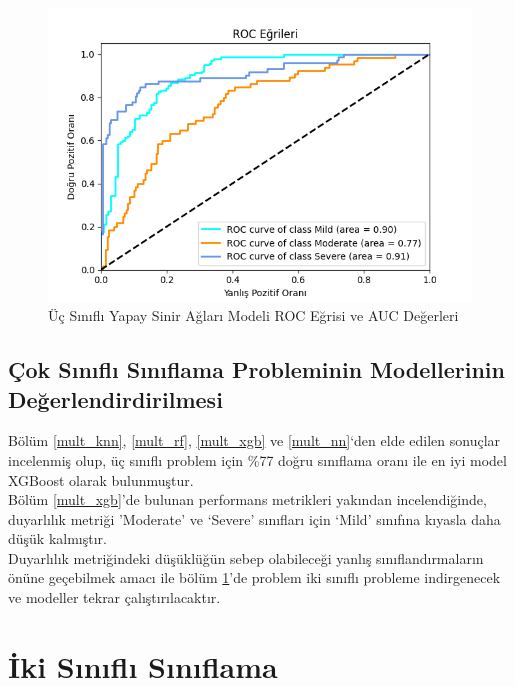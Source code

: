 \documentclass[12pt,twoside]{deuthesis}
\begin{document}
\begin{figure}

{\centering \includegraphics[width=1.05\linewidth,height=0.6\textheight]{figure/roc_curve_MLPClassifier} 

}

\caption{Üç Sınıflı Yapay Sinir Ağları Modeli ROC Eğrisi ve AUC Değerleri}\label{fig:unnamed-chunk-51}
\end{figure}
\hypertarget{uxe7ok-sux131nux131flux131-sux131nux131flama-probleminin-modellerinin-deux11ferlendirdirilmesi}{%
\subsection{Çok Sınıflı Sınıflama Probleminin Modellerinin Değerlendirdirilmesi}\label{uxe7ok-sux131nux131flux131-sux131nux131flama-probleminin-modellerinin-deux11ferlendirdirilmesi}}

Bölüm \ref{mult_knn}, \ref{mult_rf}, \ref{mult_xgb} ve \ref{mult_nn}`den elde edilen sonuçlar incelenmiş olup, üç sınıflı problem için \%77 doğru sınıflama oranı ile en iyi model XGBoost olarak bulunmuştur.\\
Bölüm \ref{mult_xgb}'de bulunan performans metrikleri yakından incelendiğinde, duyarlılık metriği 'Moderate' ve `Severe' sınıfları için `Mild' sınıfına kıyasla daha düşük kalmıştır.\\
Duyarlılık metriğindeki düşüklüğün sebep olabileceği yanlış sınıflandırmaların önüne geçebilmek amacı ile bölüm \ref{binary}'de problem iki sınıflı probleme indirgenecek ve modeller tekrar çalıştırılacaktır.

\hypertarget{binary}{%
\section{İki Sınıflı Sınıflama}\label{binary}}
\end{document}
